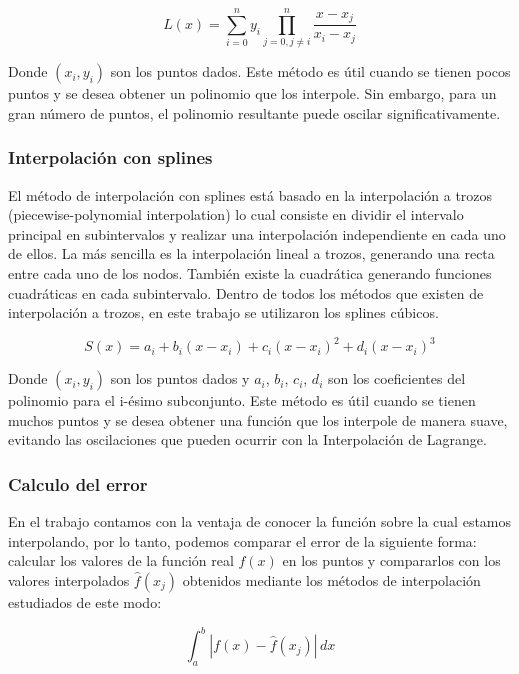 \documentclass[12pt,a4]{article} %
\begin{document}
\begin{multicols}{2}
\begin{equation}
    L(x) = \sum_{i=0}^{n} y_i \prod_{j=0, j\neq i}^{n} \frac{x - x_j}{x_i - x_j}
    \label{lagrange}
\end{equation}

Donde $(x_i, y_i)$ son los puntos dados. Este método es útil cuando se tienen pocos puntos y se desea obtener un polinomio que los interpole. Sin embargo, para un gran número de puntos, el polinomio resultante puede oscilar significativamente.
\subsubsection{Interpolación con splines}
El método de interpolación con splines está basado en la interpolación a trozos (piecewise-polynomial interpolation) lo cual consiste en dividir el intervalo principal en subintervalos y realizar una interpolación independiente en cada uno de ellos. La más sencilla es la interpolación lineal a trozos, generando una recta entre cada uno de los nodos. También existe la cuadrática generando funciones cuadráticas en cada subintervalo. Dentro de todos los métodos que existen de interpolación a trozos, en este trabajo se utilizaron los splines cúbicos.

\begin{equation}
    S(x) = a_i + b_i(x - x_i) + c_i(x - x_i)^2 + d_i(x - x_i)^3
    \label{spline cubico}
\end{equation}

Donde $(x_i, y_i)$ son los puntos dados y $a_i$, $b_i$, $c_i$, $d_i$ son los coeficientes del polinomio para el i-ésimo subconjunto. Este método es útil cuando se tienen muchos puntos y se desea obtener una función que los interpole de manera suave, evitando las oscilaciones que pueden ocurrir con la Interpolación de Lagrange.

\subsubsection{Calculo del error}
En el trabajo contamos con la ventaja de conocer la función sobre la cual estamos interpolando, por lo tanto, podemos comparar el error de la siguiente forma: calcular los valores de la función real $f(x)$ en los puntos y compararlos con los valores interpolados $\hat{f}(x_j)$ obtenidos mediante los métodos de interpolación estudiados de este modo:

\begin{equation}
    \int_{a}^{b} |f(x) - \hat{f}(x_j) | \,  dx
\end{equation}


\end{multicols}
\end{document}
